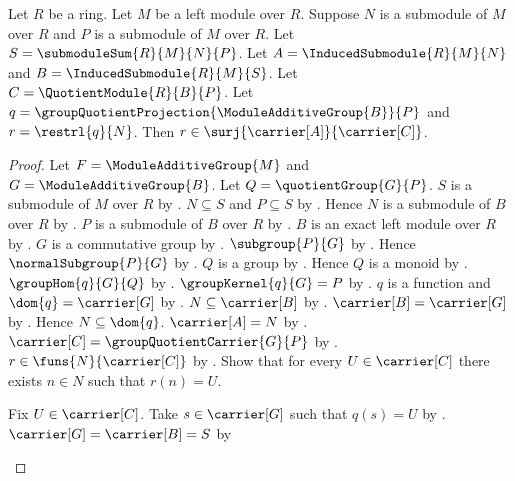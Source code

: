 \begin{theorem}\label{module_second_isomorphism_restriction_surjective}
    Let $R$ be a ring.
    Let $M$ be a left module over $R$.
    Suppose $N$ is a submodule of $M$ over $R$ and
        $P$ is a submodule of $M$ over $R$.
    Let $S=\submoduleSum{R}{M}{N}{P}$.
    Let $A=\InducedSubmodule{R}{M}{N}$ and
        $B=\InducedSubmodule{R}{M}{S}$.
    Let $C=\QuotientModule{R}{B}{P}$.
    Let $q=\groupQuotientProjection{\ModuleAdditiveGroup{B}}{P}$ and
        $r=\restrl{q}{N}$.
    Then $r\in\surj{\carrier[A]}{\carrier[C]}$.
\end{theorem}
\begin{proof}
    Let $F=\ModuleAdditiveGroup{M}$ and
        $G=\ModuleAdditiveGroup{B}$.
    Let $Q=\quotientGroup{G}{P}$.
    $S$ is a submodule of $M$ over $R$ by
        .
    $N\subseteq S$ and $P\subseteq S$ by
        .
    Hence $N$ is a submodule of $B$ over $R$ by
        .
    $P$ is a submodule of $B$ over $R$ by
        .
    $B$ is an exact left module over $R$ by
        .
    $G$ is a commutative group by
        .
    $\subgroup{P}{G}$ by .
    Hence $\normalSubgroup{P}{G}$ by
        .
    $Q$ is a group by .
    Hence $Q$ is a monoid by .
    $\groupHom{q}{G}{Q}$ by
        .
    $\groupKernel{q}{G}=P$ by
        .
    $q$ is a function and $\dom{q}=\carrier[G]$ by
        .
    $N\subseteq\carrier[B]$ by .
    $\carrier[B]=\carrier[G]$ by
        .
    Hence $N\subseteq\dom{q}$.
    $\carrier[A]=N$ by .
    $\carrier[C]=\groupQuotientCarrier{G}{P}$ by
        .
    $r\in\funs{N}{\carrier[C]}$ by
        .
    Show that for every $U\in\carrier[C]$ there exists $n\in N$
        such that $r(n)=U$.
    \begin{subproof}
        Fix $U\in\carrier[C]$.
        Take $s\in\carrier[G]$ such that $q(s)=U$ by
            .
        $\carrier[G]=\carrier[B]=S$ by

\end{subproof}
\end{proof}
